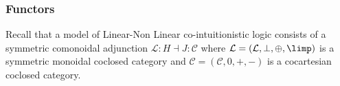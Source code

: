 
\subsubsection{Functors}\label{functors}

Recall that a model of Linear-Non Linear co-intuitionistic logic consists of  a symmetric comonoidal adjunction 
$\mathcal{L} : H \dashv  J : \mathcal{C}$ where $\mathcal{L} = (\mathcal{L}, \bot, \oplus, \limp)$ 
is a symmetric monoidal coclosed category and $\mathcal{C} = (\mathcal{C}, 0, +, -)$
 is a cocartesian coclosed category.

